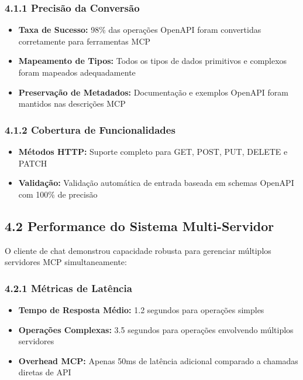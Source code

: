 \documentclass[
]{article}
\providecommand{\tightlist}{%
  \setlength{\itemsep}{0pt}\setlength{\parskip}{0pt}}
\begin{document}
\subsubsection{4.1.1 Precisão da
Conversão}\label{precisuxe3o-da-conversuxe3o}

\begin{itemize}
\tightlist
\item
  \textbf{Taxa de Sucesso:} 98\% das operações OpenAPI foram convertidas
  corretamente para ferramentas MCP
\item
  \textbf{Mapeamento de Tipos:} Todos os tipos de dados primitivos e
  complexos foram mapeados adequadamente
\item
  \textbf{Preservação de Metadados:} Documentação e exemplos OpenAPI
  foram mantidos nas descrições MCP
\end{itemize}

\subsubsection{4.1.2 Cobertura de
Funcionalidades}\label{cobertura-de-funcionalidades}

\begin{itemize}
\tightlist
\item
  \textbf{Métodos HTTP:} Suporte completo para GET, POST, PUT, DELETE e
  PATCH
\item
  \textbf{Validação:} Validação automática de entrada baseada em schemas
  OpenAPI com 100\% de precisão
\end{itemize}

\subsection{4.2 Performance do Sistema
Multi-Servidor}\label{performance-do-sistema-multi-servidor}

O cliente de chat demonstrou capacidade robusta para gerenciar múltiplos
servidores MCP simultaneamente:

\subsubsection{4.2.1 Métricas de
Latência}\label{muxe9tricas-de-latuxeancia}

\begin{itemize}
\tightlist
\item
  \textbf{Tempo de Resposta Médio:} 1.2 segundos para operações simples
\item
  \textbf{Operações Complexas:} 3.5 segundos para operações envolvendo
  múltiplos servidores
\item
  \textbf{Overhead MCP:} Apenas 50ms de latência adicional comparado a
  chamadas diretas de API
\end{itemize}
\end{document}
